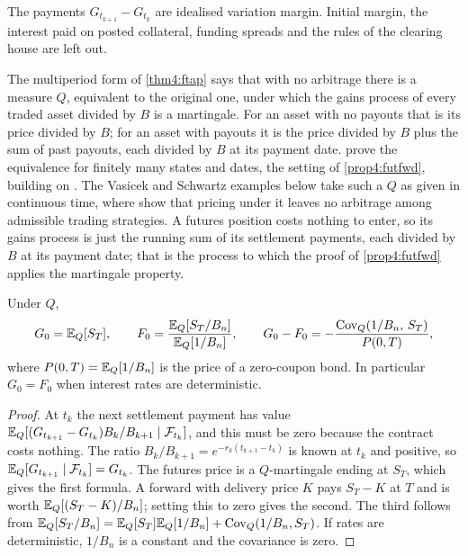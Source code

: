 \begin{chapterrefs}
The payments $G_{t_{k+1}}-G_{t_k}$ are idealised variation margin. Initial margin, the interest paid on
posted collateral, funding spreads and the rules of the clearing house are left out.

The multiperiod form of \cref{thm4:ftap} says that with no arbitrage there
is a measure $Q$, equivalent to the original one, under which the gains process of every traded asset
divided by $B$ is a martingale. For an asset with no payouts that is its price divided by $B$; for an
asset with payouts it is the price divided by $B$ plus the sum of past payouts, each divided by $B$ at
its payment date. \textcite{harrison1981} prove the equivalence for finitely many states and dates, the setting of
\cref{prop4:futfwd}, building on \textcite{harrison1979}. The Vasicek and Schwartz examples below take
such a $Q$ as given in continuous time, where \textcite{harrison1981} show that pricing under it leaves
no arbitrage among admissible trading strategies. A futures position costs nothing to enter, so its gains process is just the running sum of its
settlement payments, each divided by $B$ at its payment date; that is the process to which the proof of
\cref{prop4:futfwd} applies the martingale property.

\begin{proposition}\label{prop4:futfwd}
Under $Q$,
\begin{equation}\label{eq4:futfwd}
  G_0=\mathbb{E}_Q[S_T],\qquad F_0=\frac{\mathbb{E}_Q[S_T/B_n]}{\mathbb{E}_Q[1/B_n]},\qquad
  G_0-F_0=-\frac{\operatorname{Cov}_Q(1/B_n,\,S_T)}{P(0,T)},
\end{equation}
where $P(0,T)=\mathbb{E}_Q[1/B_n]$ is the price of a zero-coupon bond. In particular $G_0=F_0$ when interest
rates are deterministic.
\end{proposition}

\begin{proof}
At $t_k$ the next settlement payment has value $\mathbb{E}_Q[(G_{t_{k+1}}-G_{t_k})B_k/B_{k+1}\mid\mathcal
F_{t_k}]$, and this must be zero because the contract costs nothing. The ratio $B_k/B_{k+1}=e^{-r_k(t_{k+1}-t_k)}$
is known at $t_k$ and positive, so $\mathbb{E}_Q[G_{t_{k+1}}\mid\mathcal F_{t_k}]=G_{t_k}$. The futures price
is a $Q$-martingale ending at $S_T$, which gives the first formula. A forward with delivery price $K$
pays $S_T-K$ at $T$ and is worth $\mathbb{E}_Q[(S_T-K)/B_n]$; setting this to zero gives the second. The third
follows from $\mathbb{E}_Q[S_T/B_n]=\mathbb{E}_Q[S_T]\mathbb{E}_Q[1/B_n]+\operatorname{Cov}_Q(1/B_n,S_T)$. If rates are deterministic,
$1/B_n$ is a constant and the covariance is zero.
\end{proof}


\end{chapterrefs}
